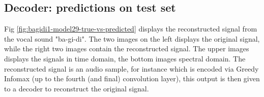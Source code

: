 	
	
	\subsection{Decoder: predictions on test set}
	Fig \ref{fig:bagidi1-model29-true-vs-predicted} displays the reconstructed signal from the vocal sound "ba-gi-di". The two images on the left displays the original signal, while the right two images contain the reconstructed signal.  The upper images displays the signals in time domain, the bottom images spectral domain. The reconstructed signal is an audio sample, for instance which is encoded via Greedy Infomax (up to the fourth (and final) convolution layer), this output is then given to a decoder to reconstruct the original signal.
	



